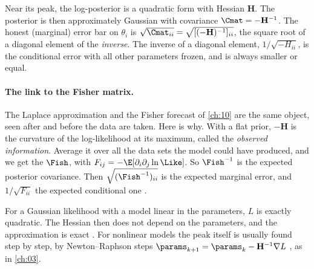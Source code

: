 \begin{keyidea}
Near its peak, the log-posterior is a quadratic form with Hessian $\mathbf H$. The
posterior is then approximately Gaussian with covariance $\Cmat=-\mathbf H^{-1}$. The
honest (marginal) error bar on $\theta_i$ is $\sqrt{\Cmat_{ii}}=\sqrt{[(-\mathbf H)^{-1}]_{ii}}$,
the square root of a diagonal element of the \emph{inverse}. The inverse of a diagonal
element, $1/\sqrt{-H_{ii}}$, is the conditional error with all other parameters frozen,
and is always smaller or equal.
\end{keyidea}

\paragraph{The link to the Fisher matrix.}
The Laplace approximation and the Fisher forecast of \cref{ch:10} are the same object,
seen after and before the data are taken. Here is why. With a flat prior, $-\mathbf H$
is the curvature of the log-likelihood at its maximum, called the \emph{observed
information}. Average it over all the data sets the model could have produced, and we
get the  $\Fish$, with $F_{ij}=-\E[\partial_i\partial_j\ln
\Like]$. So $\Fish^{-1}$ is the expected posterior covariance. Then
$\sqrt{(\Fish^{-1})_{ii}}$ is the expected marginal error, and $1/\sqrt{F_{ii}}$ the
expected conditional one .

For a Gaussian likelihood with a model linear in the parameters, $L$ is exactly
quadratic. The Hessian then does not depend on the parameters, and the approximation is
exact . For nonlinear models the peak itself is usually
found step by step, by Newton--Raphson steps $\params_{k+1}=\params_k-\mathbf H^{-1}
\nabla L$ , as in \cref{ch:03}.

